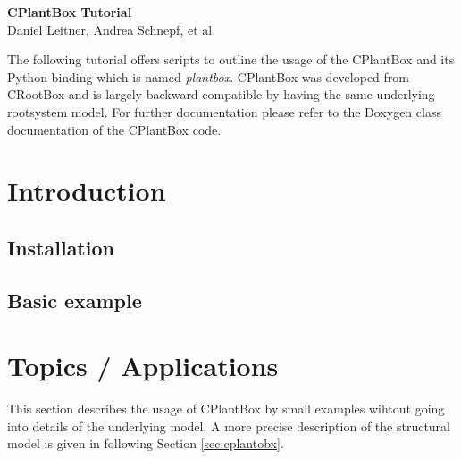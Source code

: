 \documentclass[a4paper]{article}
\begin{document}
\begin{center}
\vspace{0.5 cm}
\huge{\textbf{CPlantBox Tutorial}} \\
\vspace{0.5 cm}
\normalsize
Daniel Leitner, Andrea Schnepf, et al. \\
\end{center}

\vspace{0.5 cm}

\noindent 
The following tutorial offers scripts to outline the usage of the CPlantBox \citep{zhou2020cplantbox} and its Python binding which is named \emph{plantbox}. CPlantBox was developed from CRootBox \citep{schnepf2018crootbox} and is largely backward compatible by having the same underlying rootsystem model. For further documentation please refer to the Doxygen class documentation of the CPlantBox code.
 

\vspace{0.5 cm}

\tableofcontents

\newpage
\section{Introduction} \label{sec:introduction}

\subsection{Installation} \label{ssec:installation}


\subsection{Basic example} \label{ssec:basic_example}




\newpage
\section{Topics / Applications} \label{sec:topcis}

This section describes the usage of CPlantBox by small examples wihtout going into details of the underlying model. A more precise description of the structural model is given in following Section \ref{sec:cplantobx}. 
\end{document}
